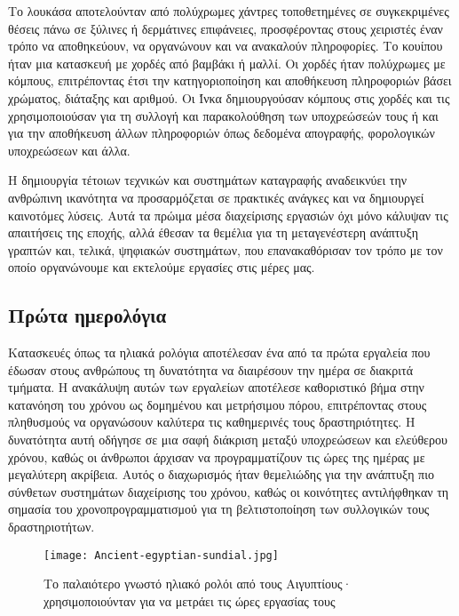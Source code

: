             Το λουκάσα αποτελούνταν από πολύχρωμες χάντρες τοποθετημένες σε συγκεκριμένες θέσεις πάνω σε ξύλινες ή δερμάτινες επιφάνειες, προσφέροντας στους χειριστές έναν τρόπο να αποθηκεύουν, να οργανώνουν και να ανακαλούν πληροφορίες. \cite{Lukasa} Το κουίπου ήταν μια κατασκευή με χορδές από βαμβάκι ή μαλλί. Οι χορδές ήταν πολύχρωμες με κόμπους, επιτρέποντας έτσι την κατηγοριοποίηση και αποθήκευση πληροφοριών βάσει χρώματος, διάταξης και αριθμού. Οι Ίνκα δημιουργούσαν κόμπους στις χορδές και τις χρησιμοποιούσαν για τη συλλογή και παρακολούθηση των υποχρεώσεών τους ή και για την αποθήκευση άλλων πληροφοριών όπως δεδομένα απογραφής, φορολογικών υποχρεώσεων και άλλα. \cite{Quipu}

            Η δημιουργία τέτοιων τεχνικών και συστημάτων καταγραφής αναδεικνύει την ανθρώπινη ικανότητα να προσαρμόζεται σε πρακτικές ανάγκες και να δημιουργεί καινοτόμες λύσεις. Αυτά τα πρώιμα μέσα διαχείρισης εργασιών όχι μόνο κάλυψαν τις απαιτήσεις της εποχής, αλλά έθεσαν τα θεμέλια για τη μεταγενέστερη ανάπτυξη γραπτών και, τελικά, ψηφιακών συστημάτων, που επανακαθόρισαν τον τρόπο με τον οποίο οργανώνουμε και εκτελούμε εργασίες στις μέρες μας.


        \subsection{Πρώτα ημερολόγια}
            Κατασκευές όπως τα ηλιακά ρολόγια αποτέλεσαν ένα από τα πρώτα εργαλεία που έδωσαν στους ανθρώπους τη δυνατότητα να διαιρέσουν την ημέρα σε διακριτά τμήματα. Η ανακάλυψη αυτών των εργαλείων αποτέλεσε καθοριστικό βήμα στην κατανόηση του χρόνου ως δομημένου και μετρήσιμου πόρου, επιτρέποντας στους πληθυσμούς να οργανώσουν καλύτερα τις καθημερινές τους δραστηριότητες. Η δυνατότητα αυτή οδήγησε σε μια σαφή διάκριση μεταξύ υποχρεώσεων και ελεύθερου χρόνου, καθώς οι άνθρωποι άρχισαν να προγραμματίζουν τις ώρες της ημέρας με μεγαλύτερη ακρίβεια. Αυτός ο διαχωρισμός ήταν θεμελιώδης για την ανάπτυξη πιο σύνθετων συστημάτων διαχείρισης του χρόνου, καθώς οι κοινότητες αντιλήφθηκαν τη σημασία του χρονοπρογραμματισμού για τη βελτιστοποίηση των συλλογικών τους δραστηριοτήτων.

            \begin{figure}[h!] \noindent \centering
                \texttt{[image: Ancient-egyptian-sundial.jpg]}
                \caption{\centering Το παλαιότερο γνωστό ηλιακό ρολόι από τους Αιγυπτίους· \\ χρησιμοποιούνταν για να μετράει τις ώρες εργασίας τους}
            \end{figure}

